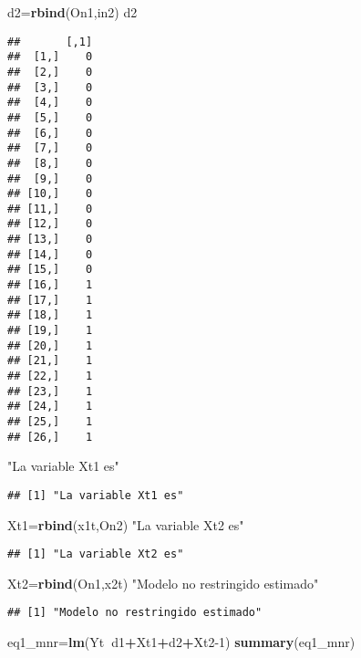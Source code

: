 \documentclass[
]{article}
\newenvironment{Shaded}{\begin{snugshade}}{\end{snugshade}}
\newcommand{\DecValTok}[1]{\textcolor[rgb]{0.00,0.00,0.81}{#1}}
\newcommand{\KeywordTok}[1]{\textcolor[rgb]{0.13,0.29,0.53}{\textbf{#1}}}
\newcommand{\NormalTok}[1]{#1}
\newcommand{\OperatorTok}[1]{\textcolor[rgb]{0.81,0.36,0.00}{\textbf{#1}}}
\newcommand{\StringTok}[1]{\textcolor[rgb]{0.31,0.60,0.02}{#1}}
\begin{document}
\begin{Shaded}
\begin{Highlighting}[]
\NormalTok{d2=}\KeywordTok{rbind}\NormalTok{(On1,in2)}
\NormalTok{d2}
\end{Highlighting}
\end{Shaded}

\begin{verbatim}
##       [,1]
##  [1,]    0
##  [2,]    0
##  [3,]    0
##  [4,]    0
##  [5,]    0
##  [6,]    0
##  [7,]    0
##  [8,]    0
##  [9,]    0
## [10,]    0
## [11,]    0
## [12,]    0
## [13,]    0
## [14,]    0
## [15,]    0
## [16,]    1
## [17,]    1
## [18,]    1
## [19,]    1
## [20,]    1
## [21,]    1
## [22,]    1
## [23,]    1
## [24,]    1
## [25,]    1
## [26,]    1
\end{verbatim}

\begin{Shaded}
\begin{Highlighting}[]
\StringTok{"La variable Xt1 es"}
\end{Highlighting}
\end{Shaded}

\begin{verbatim}
## [1] "La variable Xt1 es"
\end{verbatim}

\begin{Shaded}
\begin{Highlighting}[]
\NormalTok{Xt1=}\KeywordTok{rbind}\NormalTok{(x1t,On2)}
\StringTok{"La variable Xt2 es"}
\end{Highlighting}
\end{Shaded}

\begin{verbatim}
## [1] "La variable Xt2 es"
\end{verbatim}

\begin{Shaded}
\begin{Highlighting}[]
\NormalTok{Xt2=}\KeywordTok{rbind}\NormalTok{(On1,x2t)}
\StringTok{"Modelo no restringido estimado"}
\end{Highlighting}
\end{Shaded}

\begin{verbatim}
## [1] "Modelo no restringido estimado"
\end{verbatim}

\begin{Shaded}
\begin{Highlighting}[]
\NormalTok{eq1_mnr=}\KeywordTok{lm}\NormalTok{(Yt}\OperatorTok{~}\NormalTok{d1}\OperatorTok{+}\NormalTok{Xt1}\OperatorTok{+}\NormalTok{d2}\OperatorTok{+}\NormalTok{Xt2}\DecValTok{-1}\NormalTok{)}
\KeywordTok{summary}\NormalTok{(eq1_mnr)}
\end{Highlighting}
\end{Shaded}
\end{document}
